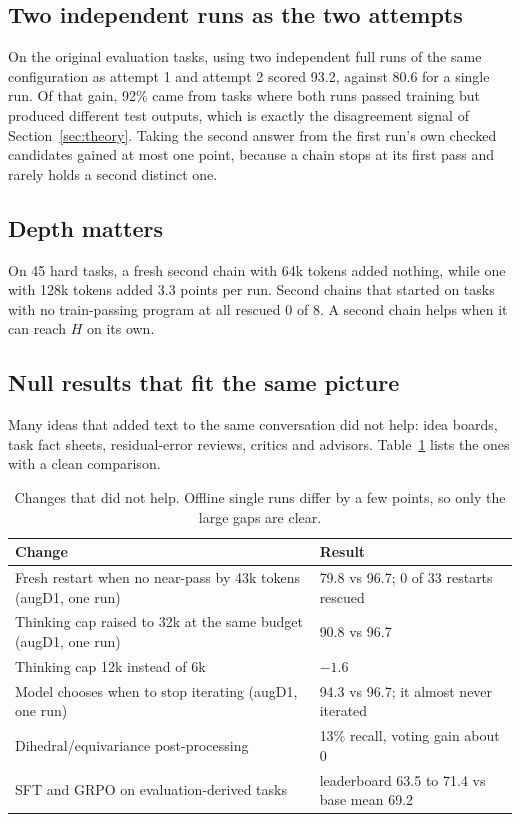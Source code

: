 \documentclass[11pt]{article}
\begin{document}
\subsection{Two independent runs as the two attempts}
On the original evaluation tasks, using two independent full runs of the same configuration as attempt 1 and attempt 2 scored 93.2, against 80.6 for a single run. Of that gain, 92\% came from tasks where both runs passed training but produced different test outputs, which is exactly the disagreement signal of Section~\ref{sec:theory}. Taking the second answer from the first run's own checked candidates gained at most one point, because a chain stops at its first pass and rarely holds a second distinct one.

\subsection{Depth matters}
On 45 hard tasks, a fresh second chain with 64k tokens added nothing, while one with 128k tokens added 3.3 points per run. Second chains that started on tasks with no train-passing program at all rescued 0 of 8. A second chain helps when it can reach $H$ on its own.

\subsection{Null results that fit the same picture}\label{sec:null}
Many ideas that added text to the same conversation did not help: idea boards, task fact sheets, residual-error reviews, critics and advisors. Table~\ref{tab:null} lists the ones with a clean comparison.

\begin{table}[H]\centering\small
\begin{tabularx}{\linewidth}{@{}Xl@{}}
\toprule
Change & Result \\
\midrule
Fresh restart when no near-pass by 43k tokens (augD1, one run) & 79.8 vs 96.7; 0 of 33 restarts rescued \\
Thinking cap raised to 32k at the same budget (augD1, one run) & 90.8 vs 96.7 \\
Thinking cap 12k instead of 6k & $-1.6$ \\
Model chooses when to stop iterating (augD1, one run) & 94.3 vs 96.7; it almost never iterated \\
Dihedral/equivariance post-processing & 13\% recall, voting gain about 0 \\
SFT and GRPO on evaluation-derived tasks & leaderboard 63.5 to 71.4 vs base mean 69.2 \\
\bottomrule
\end{tabularx}
\caption{Changes that did not help. Offline single runs differ by a few points, so only the large gaps are clear.}\label{tab:null}
\end{table}
\end{document}
